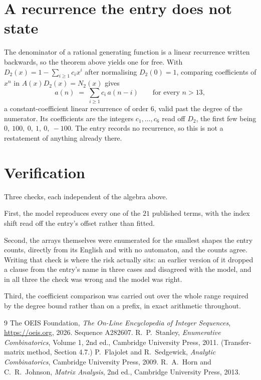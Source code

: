 \documentclass[11pt,a4paper]{article}
\theoremstyle{plain}
\theoremstyle{definition}
\begin{document}
\section{A recurrence the entry does not state}

The denominator of a rational generating function is a linear recurrence written backwards, so
the theorem above yields one for free. With $D_2(x)=1-\sum_{i\ge1}c_ix^i$ after normalising
$D_2(0)=1$, comparing coefficients of $x^n$ in $A(x)D_2(x)=N_2(x)$ gives
\[
a(n)\;=\;\sum_{i\ge1}c_i\,a(n-i)\qquad\text{for every }n>13,
\]
a constant-coefficient linear recurrence of order $6$, valid past the degree of the
numerator. Its coefficients are the integers $c_1,\dots,c_{6}$ read off $D_2$, the first few being $0,\ 100,\ 0,\ 1,\ 0,\ -100$. The entry records no recurrence, so this is not a restatement of anything
already there.

\section{Verification}

Three checks, each independent of the algebra above.

First, the model reproduces every one of the $21$ published terms, with the index shift
read off the entry's offset rather than fitted.

Second, the arrays themselves were enumerated for the smallest shapes the entry counts,
directly from its English and with no automaton, and the counts agree. Writing that check is
where the risk actually sits: an earlier version of it dropped a clause from the entry's name
in three cases and disagreed with the model, and in all three the check was wrong and the model
was right.

Third, the coefficient comparison was carried out over the whole range required by the degree
bound rather than on a prefix, in exact arithmetic throughout.

\begin{thebibliography}{9}
 The OEIS Foundation, \emph{The On-Line Encyclopedia of Integer
Sequences}, \url{https://oeis.org}, 2026. Sequence A282607.
 R.~P.~Stanley, \emph{Enumerative Combinatorics}, Volume 1, 2nd ed.,
Cambridge University Press, 2011. (Transfer-matrix method, Section 4.7.)
 P.~Flajolet and R.~Sedgewick, \emph{Analytic Combinatorics}, Cambridge
University Press, 2009.
 R.~A.~Horn and C.~R.~Johnson, \emph{Matrix Analysis}, 2nd ed., Cambridge
University Press, 2013.
\end{thebibliography}
\end{document}

